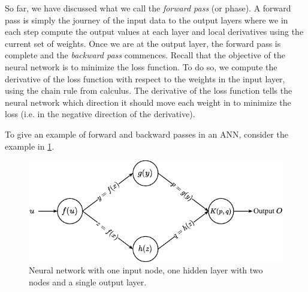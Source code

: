 So far, we have discussed what we call the \textit{forward pass} (or phase). A forward pass is simply the journey of the input data to the output layers where we in each step compute the output values at each layer and local derivatives using the current set of weights. Once we are at the output layer, the forward pass is complete and the \textit{backward pass} commences. Recall that the objective of the neural network is to minimize the loss function. To do so, we compute the derivative of the loss function with respect to the weights in the input layer, using the chain rule from calculus. The derivative of the loss function tells the neural network which direction it should move each weight in to minimize the loss (i.e. in the negative direction of the derivative).

To give an example of forward and backward passes in an ANN, consider the example in \cref{fig:neural-network-example-backprop}.
\begin{figure}[H]
    \centering
    \includegraphics[width=12cm]{thesis/figures/artificial-neural-network-backprop-example_cropped.pdf}
    \caption{Neural network with one input node, one hidden layer with two nodes and a single output layer.}
    \label{fig:neural-network-example-backprop}
\end{figure}

